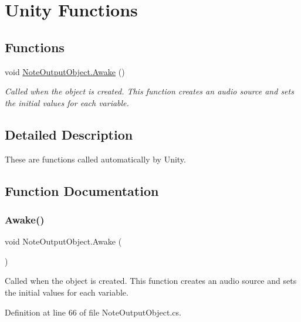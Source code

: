 \hypertarget{group___n_o_o_unity}{}\section{Unity Functions}
\label{group___n_o_o_unity}
\subsection*{Functions}
\begin{DoxyCompactItemize}
\item 
void \hyperlink{group___n_o_o_unity_ga5c3cd343b7bfe7dec693d2cb69ec3cce}{Note\+Output\+Object.\+Awake} ()
\begin{DoxyCompactList}\small\item\em Called when the object is created. This function creates an audio source and sets the initial values for each variable. \end{DoxyCompactList}\end{DoxyCompactItemize}


\subsection{Detailed Description}
These are functions called automatically by Unity. 

\subsection{Function Documentation}
\mbox{\label{group___n_o_o_unity_ga5c3cd343b7bfe7dec693d2cb69ec3cce}} 
\subsubsection{\texorpdfstring{Awake()}{Awake()}}
{\footnotesize\ttfamily void Note\+Output\+Object.\+Awake (\begin{DoxyParamCaption}{ }\end{DoxyParamCaption})\hspace{0.3cm}{\ttfamily [private]}}



Called when the object is created. This function creates an audio source and sets the initial values for each variable. 



Definition at line 66 of file Note\+Output\+Object.\+cs.


